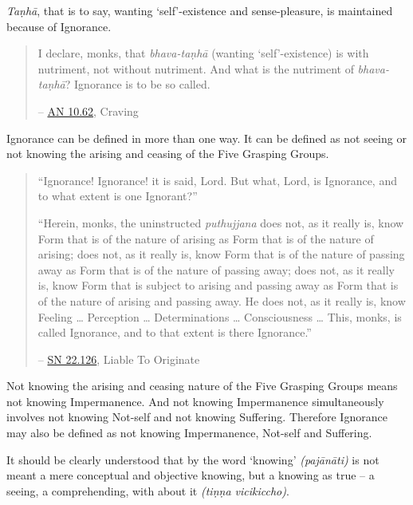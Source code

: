 \emph{Taṇhā}, that is to say, wanting `self'-existence and sense-pleasure, is maintained because of Ignorance.

\begin{quote}
I declare, monks, that \emph{bhava-taṇhā} (wanting `self'-existence) is with nutriment, not without nutriment. And what is the nutriment of \emph{bhava-taṇhā}? Ignorance is to be so called.

 -- \href{https://suttacentral.net/an10.62/en/bodhi}{AN 10.62}, Craving
\end{quote}

Ignorance can be defined in more than one way. It can be defined as not seeing or not knowing the arising and ceasing of the Five Grasping Groups.

\begin{quote}
``Ignorance! Ignorance! it is said, Lord. But what, Lord, is Ignorance, and to what extent is one Ignorant?''

``Herein, monks, the uninstructed \emph{puthujjana} does not, as it really is, know Form that is of the nature of arising as Form that is of the nature of arising; does not, as it really is, know Form that is of the nature of passing away as Form that is of the nature of passing away; does not, as it really is, know Form that is subject to arising and passing away as Form that is of the nature of arising and passing away. He does not, as it really is, know Feeling \ldots\hspace{0pt} Perception \ldots\hspace{0pt} Determinations \ldots\hspace{0pt} Consciousness \ldots\hspace{0pt} This, monks, is called Ignorance, and to that extent is there Ignorance.''

 -- \href{https://suttacentral.net/sn22.126/en/sujato}{SN 22.126}, Liable To Originate
\end{quote}

Not knowing the arising and ceasing nature of the Five Grasping Groups means not knowing Impermanence. And not knowing Impermanence simultaneously involves not knowing Not-self and not knowing Suffering. Therefore Ignorance may also be defined as not knowing Impermanence, Not-self and Suffering.

It should be clearly understood that by the word `knowing' \emph{(pajānāti)} is not meant a mere conceptual and objective knowing, but a knowing as true -- a seeing, a comprehending, with  about it \emph{(tiṇṇa vicikiccho)}.

